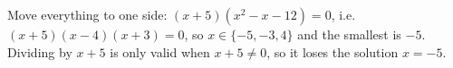 Move everything to one side: $(x+5)(x^2-x-12)=0$, i.e. $(x+5)(x-4)(x+3)=0$, so $x\in\{-5,-3,4\}$ and the smallest is $\boxed{-5}$. Dividing by $x+5$ is only valid when $x+5\ne0$, so it loses the solution $x=-5$.

